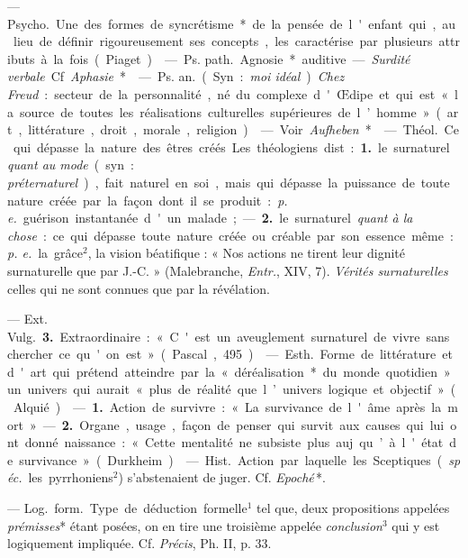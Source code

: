 \begin{itemize}[leftmargin=1cm, label=, itemsep=1pt]
 — \si{Psycho.} Une des formes de syncrétisme* de la
pensée de l'enfant qui, au lieu de définir rigoureusement ses concepts, les
caractérise par plusieurs attributs à la fois (Piaget).

 — \si{Ps. path.} Agnosie* auditive. — {\it Surdité
verbale}. Cf. {\it Aphasie}*.

 — \si{Ps. an.} (Syn. : {\it moi idéal}). {\it Chez Freud} :
secteur de la personnalité, né du complexe d'Œdipe et qui est « la source de
toutes les réalisations culturelles supérieures de l’homme » (art,
littérature, droit, morale, religion).

 — Voir {\it Aufheben}*.

 — \si{Théol.} Ce qui dépasse la nature des êtres créés. Les
théologiens dist. : {\bf 1.} le surnaturel {\it quant au mode} (syn. : {\it
préternaturel}), fait naturel en soi, mais qui dépasse la puissance de toute
nature créée par la façon dont il se produit : {\it p. e.} guérison
instantanée d'un malade; — {\bf 2.} le surnaturel {\it quant à la chose} :
ce qui dépasse toute nature créée ou créable par son essence même :
{\it p. e.} la grâce$^2$, la vision béatifique : « Nos actions ne tirent
leur dignité surnaturelle que par J.-C. » (Malebranche, {\it Entr.}, XIV,
7). {\it Vérités surnaturelles} celles qui ne sont connues que par la
révélation.

— Ext. \si{Vulg.} {\bf 3.} Extraordinaire : « C'est un aveuglement
surnaturel de vivre sans chercher ce qu'on est » (Pascal, 495).

 — \si{Esth.} Forme de littérature et d'art qui prétend
atteindre par la « déréalisation* du monde quotidien » un univers qui aurait
« plus de réalité que l’univers logique et objectif » (Alquié).

 — {\bf 1.} Action de survivre : « La survivance de l'âme après la
mort » — {\bf 2.} Organe, usage, façon de penser qui survit aux causes qui
lui ont donné naissance : « Cette mentalité ne subsiste plus auj. qu’à
l'état de survivance » (Durkheim).

 — \si{Hist.} Action par laquelle les Sceptiques
({\it spéc.} les pyrrhoniens$^2$) s’abstenaient de juger. Cf. {\it Epoché}\,*.

 — \si{Log.} \si{form.} Type de déduction formelle$^1$ tel
que, deux propositions appelées {\it prémisses}* étant posées, on en tire
une troisième appelée {\it conclusion}$^3$ qui y est logiquement impliquée.
Cf. {\it Précis}, Ph. II, p. 33.


\end{itemize}
